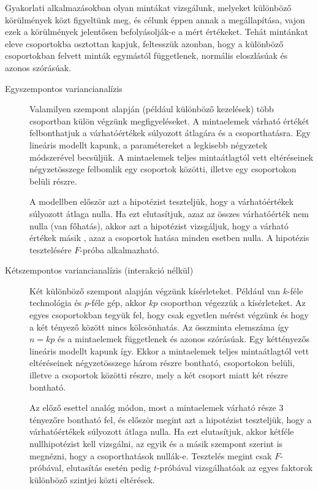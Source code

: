 \documentclass[DIV=15,appendixprefix]{scrreprt}
\theoremstyle{definition}
\theoremstyle{remark}
\begin{document}
Gyakorlati alkalmazásokban olyan mintákat vizsgálunk, melyeket különböző
körülmények közt figyeltünk meg, és célunk éppen annak a megállapítása, vajon
ezek a körülmények jelentősen befolyásolják-e a mért értékeket. Tehát mintánkat
eleve csoportokba osztottan kapjuk, feltesszük azonban, hogy a különböző csoportokban felvett minták
egymástól függetlenek, normális eloszlásúak és azonos szórásúak.
\begin{description}
	\item[Egyszempontos variancianalízis] Valamilyen szempont alapján (például különböző kezelések)
		több csoportban külön végzünk megfigyeléseket. A mintaelemek várható értékét felbonthatjuk a
		várhatóértékek súlyozott átlagára és a csoporthatásra. Egy lineáris modellt kapunk, a
		paramétereket a legkisebb négyzetek módszerével becsüljük. A mintaelemek teljes
		mintaátlagtól vett eltéréseinek négyzetösszege felbomlik egy csoportok közötti, illetve egy
		csoportokon belüli részre.

		A modellben először azt a hipotézist teszteljük, hogy a várhatóértékek súlyozott átlaga
		nulla. Ha ezt elutasítjuk, azaz az összes várhatóérték nem nulla (van főhatás), akkor azt a
		hipotézist vizsgáljuk, hogy a várható értékek másik , azaz a csoportok
		hatása minden esetben nulla. A hipotézis tesztelésére $F$-próba alkalmazható.
	\item[Kétszempontos variancianalízis (interakció nélkül)] Két különböző szempont alapján
	végzünk kísérleteket. Például van $k$-féle technológia és $p$-féle gép, akkor $k p$ csoportban
	végezzük a kísérleteket. Az egyes csoportokban tegyük fel, hogy csak egyetlen mérést végzünk és
	hogy a két tényező között nincs kölcsönhatás. Az összminta elemszáma így $n=k p$ és a
	mintaelemek függetlenek és azonos szórásúak. Egy kéttényezős lineáris modellt kapunk így. Ekkor
	a mintaelemek teljes mintaátlagtól vett eltéréseinek négyzetösszege három részre bontható,
	csoportokon belüli, illetve a csoportok közötti részre, mely a két csoport miatt két részre
	bontható.

	Az előző esettel analóg módon, most a mintaelemek várható része 3 tényezőre bontható fel, és
	először megint azt a hipotézist teszteljük, hogy a várhatóértékek súlyozott átlaga nulla. Ha ezt
	elutasítjuk, akkor kétféle nullhipotézist kell vizsgálni, az egyik és a másik szempont szerint
	is megnézni, hogy a csoporthatások nullák-e. Tesztelés megint csak $F$-próbával, elutasítás
	esetén pedig $t$-próbával vizsgálhatóak az egyes faktorok különböző szintjei közti eltérések.
\end{description}
%
\end{document}
